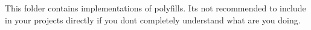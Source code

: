 This folder contains implementations of polyfills. It\textquotesingle{}s not recommended to include in your projects directly if you don\textquotesingle{}t completely understand what are you doing. 